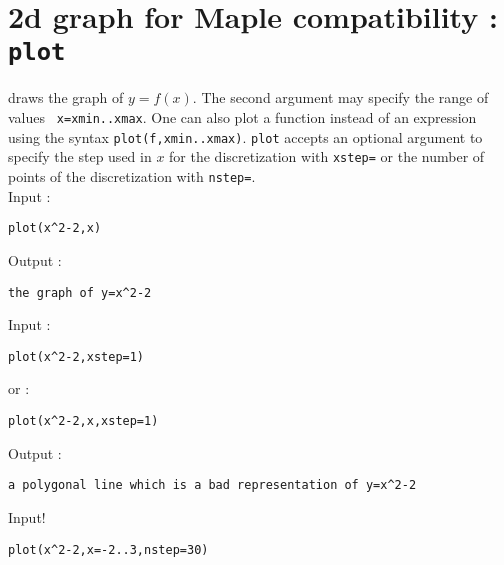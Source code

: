 \documentclass[a4paper,11pt]{book}
\begin{document}
\section{2d graph for Maple compatibility : {\tt plot}}
 \label{sec:plot2d}
 draws the graph of $y=f(x)$. 
The second argument may specify the range of values {\tt
  x=xmin..xmax}. One can also plot a function instead of an
expression using the syntax {\tt plot(f,xmin..xmax)}.
{\tt plot} accepts an optional argument to specify 
the step used in $x$ for the discretization with  
\verb|xstep=| or the number of points of the discretization
with \verb|nstep=|.\\
Input :
\begin{center}{\tt  plot(x\verb|^|2-2,x)}\end{center}
Output :
\begin{center}{\tt the graph of y=x\verb|^|2-2}\end{center}
Input :
\begin{center}{\tt  plot(x\verb|^|2-2,xstep=1)}\end{center}
or :
\begin{center}{\tt  plot(x\verb|^|2-2,x,xstep=1)}\end{center}
Output :
\begin{center}{\tt a polygonal line which is a bad representation of
    y=x\verb|^|2-2 }\end{center}
Input!
\begin{center}{\tt  plot(x\verb|^|2-2,x=-2..3,nstep=30)}\end{center}
\end{document}

